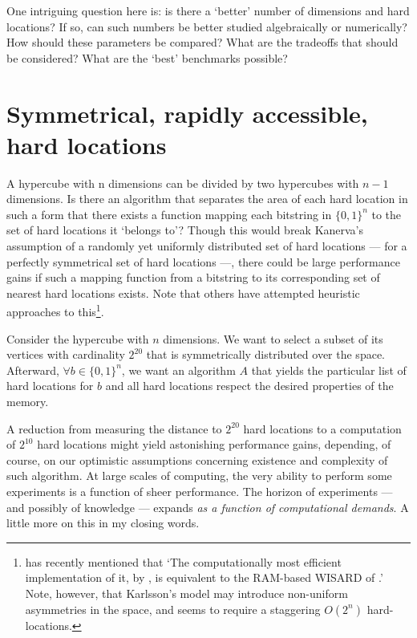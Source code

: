 One intriguing question here is:  is there a `better' number of dimensions and hard locations?  If so, can such numbers be better studied algebraically or numerically? How should these parameters be compared?  What are the tradeoffs that should be considered?  What are the `best' benchmarks possible?




\section{Symmetrical, rapidly accessible, hard locations}

A hypercube with n dimensions can be divided by two hypercubes with $n-1$ dimensions. Is there an algorithm that separates the area of each hard location in such a form that there exists a function mapping each bitstring in $\{0,1\}^n$ to the set of hard locations it `belongs to'?  Though this would break Kanerva's assumption of a randomly yet uniformly distributed set of hard locations --- for a perfectly symmetrical set of hard locations ---, there could be large performance gains if such a mapping function from a bitstring to its corresponding set of nearest hard locations exists. Note that others have attempted heuristic approaches to this\footnote{\citet{Kanerva2009} has recently mentioned that `The computationally most efficient implementation of it, by \citet{Karlsson95afast}, is equivalent to the RAM-based WISARD of  \citet{aleksander1982computer}.' Note, however, that Karlsson's model may introduce non-uniform asymmetries in the space, and seems to require a staggering $O(2^n)$ hard-locations.}.

Consider the hypercube with $n$ dimensions.  We want to select a subset of its vertices with cardinality $2^{20}$ that is symmetrically distributed over the space. Afterward, $\forall b \in \{ 0,1\} ^n$, we want an algorithm $A$ that yields the particular list of hard locations for $b$ and all hard locations respect the desired properties of the memory.

A reduction from measuring the distance to $2^{20}$ hard locations to a computation of $2^{10}$ hard locations might yield astonishing performance gains, depending, of course, on our optimistic assumptions concerning existence and complexity of such algorithm.  At large scales of computing, the very ability to perform some experiments is a function of sheer performance. The horizon of experiments --- and possibly of knowledge --- expands \emph{as a function of computational demands}. A little more on this in my closing words.



